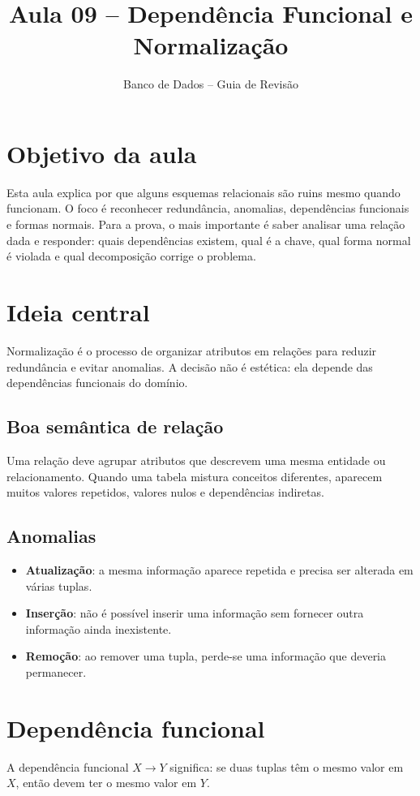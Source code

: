 \documentclass[12pt,a4paper]{article}
\title{Aula 09 -- Dependência Funcional e Normalização}
\author{Banco de Dados -- Guia de Revisão}
\date{}
\begin{document}
\maketitle
\tableofcontents
\newpage

\section{Objetivo da aula}
Esta aula explica por que alguns esquemas relacionais são ruins mesmo quando funcionam. O foco é reconhecer redundância, anomalias, dependências funcionais e formas normais. Para a prova, o mais importante é saber analisar uma relação dada e responder: quais dependências existem, qual é a chave, qual forma normal é violada e qual decomposição corrige o problema.

\section{Ideia central}
Normalização é o processo de organizar atributos em relações para reduzir redundância e evitar anomalias. A decisão não é estética: ela depende das dependências funcionais do domínio.

\subsection{Boa semântica de relação}
Uma relação deve agrupar atributos que descrevem uma mesma entidade ou relacionamento. Quando uma tabela mistura conceitos diferentes, aparecem muitos valores repetidos, valores nulos e dependências indiretas.

\subsection{Anomalias}
\begin{itemize}
    \item \textbf{Atualização}: a mesma informação aparece repetida e precisa ser alterada em várias tuplas.
    \item \textbf{Inserção}: não é possível inserir uma informação sem fornecer outra informação ainda inexistente.
    \item \textbf{Remoção}: ao remover uma tupla, perde-se uma informação que deveria permanecer.
\end{itemize}

\section{Dependência funcional}
A dependência funcional $X \rightarrow Y$ significa: se duas tuplas têm o mesmo valor em $X$, então devem ter o mesmo valor em $Y$.
\end{document}
